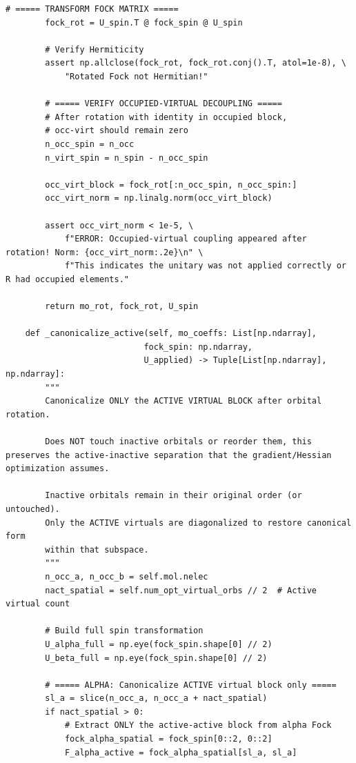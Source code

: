 \begin{lstlisting}[style=python, caption={...}, label=lst:full_code]
        # ===== TRANSFORM FOCK MATRIX =====
        fock_rot = U_spin.T @ fock_spin @ U_spin
        
        # Verify Hermiticity
        assert np.allclose(fock_rot, fock_rot.conj().T, atol=1e-8), \
            "Rotated Fock not Hermitian!"
        
        # ===== VERIFY OCCUPIED-VIRTUAL DECOUPLING =====
        # After rotation with identity in occupied block, 
        # occ-virt should remain zero
        n_occ_spin = n_occ
        n_virt_spin = n_spin - n_occ_spin
        
        occ_virt_block = fock_rot[:n_occ_spin, n_occ_spin:]
        occ_virt_norm = np.linalg.norm(occ_virt_block)
        
        assert occ_virt_norm < 1e-5, \
            f"ERROR: Occupied-virtual coupling appeared after rotation! Norm: {occ_virt_norm:.2e}\n" \
            f"This indicates the unitary was not applied correctly or R had occupied elements."
        
        return mo_rot, fock_rot, U_spin

    def _canonicalize_active(self, mo_coeffs: List[np.ndarray],
                            fock_spin: np.ndarray,
                            U_applied) -> Tuple[List[np.ndarray], np.ndarray]:
        """
        Canonicalize ONLY the ACTIVE VIRTUAL BLOCK after orbital rotation.
        
        Does NOT touch inactive orbitals or reorder them, this preserves the active-inactive separation that the gradient/Hessian optimization assumes.
        
        Inactive orbitals remain in their original order (or untouched).
        Only the ACTIVE virtuals are diagonalized to restore canonical form
        within that subspace.
        """
        n_occ_a, n_occ_b = self.mol.nelec
        nact_spatial = self.num_opt_virtual_orbs // 2  # Active virtual count
        
        # Build full spin transformation
        U_alpha_full = np.eye(fock_spin.shape[0] // 2)
        U_beta_full = np.eye(fock_spin.shape[0] // 2)
        
        # ===== ALPHA: Canonicalize ACTIVE virtual block only =====
        sl_a = slice(n_occ_a, n_occ_a + nact_spatial)
        if nact_spatial > 0:
            # Extract ONLY the active-active block from alpha Fock
            fock_alpha_spatial = fock_spin[0::2, 0::2]
            F_alpha_active = fock_alpha_spatial[sl_a, sl_a]
            

\end{lstlisting}
